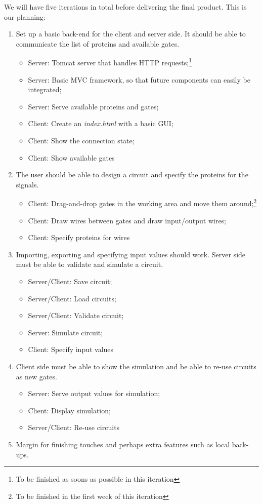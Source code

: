 \documentclass[a4paper]{article}
\begin{document}
We will have five iterations in total before delivering the final product. This is our planning:
\begin{enumerate}
\item Set up a basic back-end for the client and server side. It should be able to communicate the list of proteins and available gates.
	\begin{itemize}
	\item Server: Tomcat server that handles HTTP requests;\footnote[1]{To be finished as soons as possible in this iteration}
	\item Server: Basic MVC framework, so that future components can easily be integrated;\footnotemark[1]
	\item Server: Serve available proteins and gates;
	\item Client: Create an \emph{index.html} with a basic GUI;\footnotemark[1]
	\item Client: Show the connection state;
	\item Client: Show available gates
	\end{itemize}
\item The user should be able to design a circuit and specify the proteins for the signals.
	\begin{itemize}
	\item Client: Drag-and-drop gates in the working area and move them around;\footnote[2]{To be finished in the first week of this iteration}
	\item Client: Draw wires between gates and draw input/output wires;
	\item Client: Specify proteins for wires
	\end{itemize}
\item Importing, exporting and specifying input values should work. Server side must be able to validate and simulate a circuit.
	\begin{itemize}
	\item Server/Client: Save circuit;\footnotemark[2]
	\item Server/Client: Load circuits;\footnotemark[2]
	\item Server/Client: Validate circuit;\footnotemark[2]
	\item Server: Simulate circuit;
	\item Client: Specify input values
	\end{itemize}
\item Client side must be able to show the simulation and be able to re-use circuits as new gates.
	\begin{itemize}
	\item Server: Serve output values for simulation;\footnotemark[2]
	\item Client: Display simulation;
	\item Server/Client: Re-use circuits
	\end{itemize}
\item Margin for finishing touches and perhaps extra features such as local back-ups.
\end{enumerate}
\end{document}
